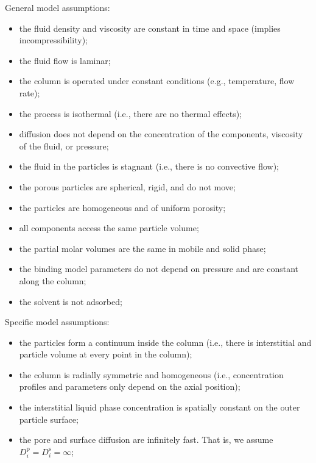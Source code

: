 \documentclass{article}
\begin{document}
General model assumptions:
\begin{itemize}
\item the fluid density and viscosity are constant in time and space (implies incompressibility);
\item the fluid flow is laminar;
\item the column is operated under constant conditions (e.g., temperature, flow rate);
\item the process is isothermal (i.e., there are no thermal effects);
\item diffusion does not depend on the concentration of the components, viscosity of the fluid, or pressure;
\item the fluid in the particles is stagnant (i.e., there is no convective flow);
\item the porous particles are spherical, rigid, and do not move;
\item the particles are homogeneous and of uniform porosity;
\item all components access the same particle volume;
\item the partial molar volumes are the same in mobile and solid phase;
\item the binding model parameters do not depend on pressure and are constant along the column;
\item the solvent is not adsorbed;
\end{itemize}


Specific model assumptions:
\begin{itemize}
\item the particles form a continuum inside the column (i.e., there is interstitial and particle volume at every point in the column);
\item the column is radially symmetric and homogeneous (i.e., concentration profiles and parameters only depend on the axial position);
\item the interstitial liquid phase concentration is spatially constant on the outer particle surface;
\item the pore and surface diffusion are infinitely fast. That is, we assume $D_{i}^{\mathrm{p}} = D_{i}^{\mathrm{s}} = \infty$;
\end{itemize}
\end{document}
